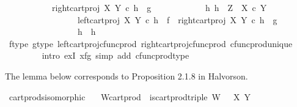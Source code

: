 \begin{isabellebody}
\ \ \ \ \ \ \ \ \ \ \ right{\isacharunderscore}{\kern0pt}cart{\isacharunderscore}{\kern0pt}proj\ X\ Y\ {\isasymcirc}\isactrlsub c\ h\ {\isacharequal}{\kern0pt}\ g\ {\isasymand}\isanewline
\ \ \ \ \ \ \ \ \ \ \ {\isacharparenleft}{\kern0pt}{\isasymforall}h{}{\isachardot}{\kern0pt}\ h{}\ {\isacharcolon}{\kern0pt}\ Z\ {\isasymrightarrow}\ X\ {\isasymtimes}\isactrlsub c\ Y\ {\isasymand}\isanewline
\ \ \ \ \ \ \ \ \ \ \ \ \ \ \ \ \ left{\isacharunderscore}{\kern0pt}cart{\isacharunderscore}{\kern0pt}proj\ X\ Y\ {\isasymcirc}\isactrlsub c\ h{}\ {\isacharequal}{\kern0pt}\ f\ {\isasymand}\ right{\isacharunderscore}{\kern0pt}cart{\isacharunderscore}{\kern0pt}proj\ X\ Y\ {\isasymcirc}\isactrlsub c\ h{}\ {\isacharequal}{\kern0pt}\ g\ {\isasymlongrightarrow}\isanewline
\ \ \ \ \ \ \ \ \ \ \ \ \ \ \ \ \ h{}\ {\isacharequal}{\kern0pt}\ h{\isacharparenright}{\kern0pt}{\isachardoublequoteclose}\isanewline
\ \ \ \ \ \ \ \isamarkupfalse%
\ f{\isacharunderscore}{\kern0pt}type\ g{\isacharunderscore}{\kern0pt}type\ left{\isacharunderscore}{\kern0pt}cart{\isacharunderscore}{\kern0pt}proj{\isacharunderscore}{\kern0pt}cfunc{\isacharunderscore}{\kern0pt}prod\ right{\isacharunderscore}{\kern0pt}cart{\isacharunderscore}{\kern0pt}proj{\isacharunderscore}{\kern0pt}cfunc{\isacharunderscore}{\kern0pt}prod\ cfunc{\isacharunderscore}{\kern0pt}prod{\isacharunderscore}{\kern0pt}unique\isanewline
\ \ \ \ \ \ \ \isamarkupfalse%
\ {\isacharparenleft}{\kern0pt}intro\ exI{\isacharbrackleft}{\kern0pt}\ x{\isacharequal}{\kern0pt}{\isachardoublequoteopen}{\isasymlangle}f{\isacharcomma}{\kern0pt}g{\isasymrangle}{\isachardoublequoteclose}{\isacharbrackright}{\kern0pt}{\isacharcomma}{\kern0pt}\ simp\ add{\isacharcolon}{\kern0pt}\ cfunc{\isacharunderscore}{\kern0pt}prod{\isacharunderscore}{\kern0pt}type{\isacharparenright}{\kern0pt}\isanewline
{}\isamarkupfalse%
%
\endisatagproof
{\isafoldproof}%
%
\isadelimproof
%
\endisadelimproof
%
\begin{isamarkuptext}%
The lemma below corresponds to Proposition 2.1.8 in Halvorson.%
\end{isamarkuptext}\isamarkuptrue%
\isamarkupfalse%
\ cart{\isacharunderscore}{\kern0pt}prods{\isacharunderscore}{\kern0pt}isomorphic{\isacharcolon}{\kern0pt}\isanewline
\ \ \ W{\isacharunderscore}{\kern0pt}cart{\isacharunderscore}{\kern0pt}prod{\isacharcolon}{\kern0pt}\ \ {\isachardoublequoteopen}is{\isacharunderscore}{\kern0pt}cart{\isacharunderscore}{\kern0pt}prod{\isacharunderscore}{\kern0pt}triple\ {\isacharparenleft}{\kern0pt}W{\isacharcomma}{\kern0pt}\ {\isasympi}\ {\isasympi}\ X\ Y{\isachardoublequoteclose}\isanewline

\end{isabellebody}
